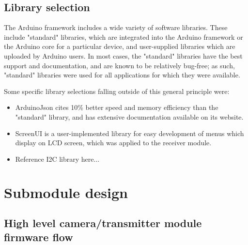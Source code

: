 \subsection{Library selection}

The Arduino framework includes a wide variety of software libraries. These include "standard" libraries, which are integrated into the Arduino framework or the Arduino core for a particular device, and user-supplied libraries which are uploaded by Arduino users. In most cases, the "standard" libraries have the best support and documentation, and are known to be relatively bug-free; as such, "standard" libraries were used for all applications for which they were available.

Some specific library selections falling outside of this general principle were:

\begin{itemize}
    \item ArduinoJson cites 10\% better speed and memory efficiency than the "standard" library, and has extensive documentation available on its website.
    \item ScreenUI  is a user-implemented library for easy development of menus which display on LCD screen, which was applied to the receiver module.
    \item Reference I2C library here...
\end{itemize}




\section{Submodule design} \label{s:firmware-design-process}

\subsection{High level camera/transmitter module firmware flow}

